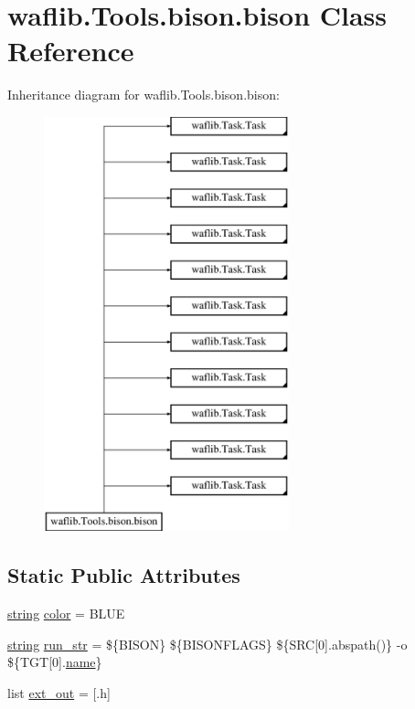 \hypertarget{classwaflib_1_1_tools_1_1bison_1_1bison}{}\section{waflib.\+Tools.\+bison.\+bison Class Reference}
\label{classwaflib_1_1_tools_1_1bison_1_1bison}
Inheritance diagram for waflib.\+Tools.\+bison.\+bison\+:\begin{figure}[H]
\begin{center}
\leavevmode
\includegraphics[height=12.000000cm]{classwaflib_1_1_tools_1_1bison_1_1bison}
\end{center}
\end{figure}
\subsection*{Static Public Attributes}
\begin{DoxyCompactItemize}
\item 
\hyperlink{test__lib_f_l_a_c_2format_8c_ab02026ad0de9fb6c1b4233deb0a00c75}{string} \hyperlink{classwaflib_1_1_tools_1_1bison_1_1bison_a7055770f943ce038eb1d6455b0998645}{color} = \textquotesingle{}B\+L\+UE\textquotesingle{}
\item 
\hyperlink{test__lib_f_l_a_c_2format_8c_ab02026ad0de9fb6c1b4233deb0a00c75}{string} \hyperlink{classwaflib_1_1_tools_1_1bison_1_1bison_aa90407d611bbca7eac76f3cef1b67b42}{run\+\_\+str} = \textquotesingle{}\$\{B\+I\+S\+ON\} \$\{B\+I\+S\+O\+N\+F\+L\+A\+GS\} \$\{S\+RC\mbox{[}0\mbox{]}.abspath()\} -\/o \$\{T\+GT\mbox{[}0\mbox{]}.\hyperlink{lib_2expat_8h_a1b49b495b59f9e73205b69ad1a2965b0}{name}\}\textquotesingle{}
\item 
list \hyperlink{classwaflib_1_1_tools_1_1bison_1_1bison_a31f9eba64362fca0db5dc677a9b1adc4}{ext\+\_\+out} = \mbox{[}\textquotesingle{}.h\textquotesingle{}\mbox{]}
\end{DoxyCompactItemize}
